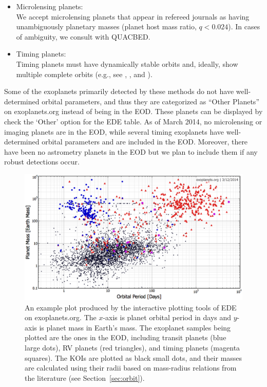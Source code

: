 \documentclass[11pt,preprint]{aastex}
\begin{document}
\begin{CJK*}{UTF8}{gbsn}
\begin{itemize}
\begin{enumerate}
\end{enumerate}
\item Microlensing planets:\\
We accept microlensing planets that appear in refereed journals as
having unambiguously planetary masses (planet host mass ratio,
$q<0.024$). In cases of ambiguity, we consult with QUACBED.  

\item Timing planets:\\
 Timing planets must have dynamically stable orbits and, ideally, show
 multiple complete orbits (e.g., see \citealt{Wittenmyer2012},
 \citealt{Horner2012}, and \citealt{Wittenmyer2013}). 

\end{itemize}
Some of the exoplanets primarily detected by these methods do not have
well-determined orbital parameters, and thus they are categorized as
``Other Planets'' on exoplanets.org instead of being in the EOD. These
planets can be displayed by check the `Other' option for the EDE
table. As of March 2014, no microlensing or imaging planets are in the
EOD, while several timing exoplanets have well-determined orbital
parameters and are included in the EOD. Moreover, there have been no astrometry planets in the EOD but we plan to include them if any robust detections occur.


\begin{figure}[!htb]
\centering
\includegraphics[width=\textwidth]{../fig/mass-per-color.eps}
\caption{An example plot produced by the interactive plotting tools of
  EDE on exoplanets.org. The $x$-axis is planet orbital period in days
  and $y$-axis is planet mass in Earth's mass. The exoplanet samples
  being plotted are the ones in the EOD, including transit planets
  (blue large dots), RV planets (red triangles), and timing planets
  (magenta squares). The KOIs are plotted as black small dots, and
  their masses are calculated using their radii based on mass-radius
  relations from the literature (see Section~\ref{sec:orbit}).}
\label{fig:koi}
\end{figure}


\end{CJK*}
\end{document}

